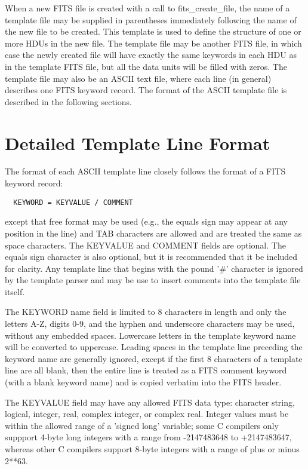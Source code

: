 \documentclass[11pt]{book}
\begin{document}
When a new FITS file is created with a call to fits\_create\_file, the
name of a template file may be supplied in parentheses immediately
following the name of the new file to be created.  This template is
used to define the structure of one or more HDUs in the new file.  The
template file may be another FITS file, in which case the newly created
file will have exactly the same keywords in each HDU as in the template
FITS file, but all the data units will be filled with zeros.  The
template file may also be an ASCII text file, where each line (in
general) describes one FITS keyword record.  The format of the ASCII
template file is described in the following sections.


\section{Detailed Template Line Format}

The format of each ASCII template line closely follows the format of a
FITS keyword record:

\begin{verbatim}
  KEYWORD = KEYVALUE / COMMENT
\end{verbatim}
except that free format may be used (e.g., the equals sign may appear
at any position in the line) and TAB characters are allowed and are
treated the same as space characters.  The KEYVALUE and COMMENT fields
are optional.  The equals sign character is also optional, but it is
recommended that it be included for clarity.  Any template line that
begins with the pound '\#' character is ignored by the template parser
and may be use to insert comments into the template file itself.

The KEYWORD name field is limited to 8 characters in length and only
the letters A-Z, digits 0-9, and the hyphen and underscore characters
may be used, without any embedded spaces. Lowercase letters in the
template keyword name will be converted to uppercase.  Leading spaces
in the template line preceding the keyword name are generally ignored,
except if the first 8 characters of a template line are all blank, then
the entire line is treated as a FITS comment keyword (with a blank
keyword name) and is copied verbatim into the FITS header.

The KEYVALUE field may have any allowed  FITS  data type: character
string, logical, integer, real, complex integer, or complex real.  Integer
values must be within the allowed range of a 'signed long' variable;
some C compilers only suppport 4-byte long integers with a range
from -2147483648 to +2147483647, whereas other C compilers support 8-byte
integers with a range of plus or minus 2**63.
\end{document}
